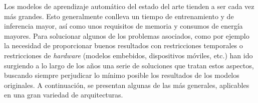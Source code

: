 Los modelos de aprendizaje automático del estado del arte tienden a ser cada vez más grandes. Esto generalmente conlleva un tiempo de entrenamiento y de inferencia mayor, así como unos requisitos de memoria y consumos de energía mayores. Para solucionar algunos de los problemas asociados, como por ejemplo la necesidad de proporcionar buenos resultados con restricciones temporales o restricciones de \textit{hardware} (modelos embebidos, dispositivos móviles, etc.) han ido surgiendo a lo largo de los años una serie de soluciones que tratan estos aspectos, buscando siempre perjudicar lo mínimo posible los resultados de los modelos originales. A continuación, se presentan algunas de las más generales, aplicables en una gran variedad de arquitecturas.




